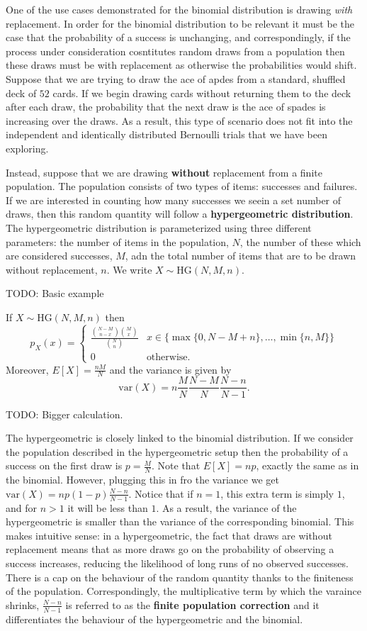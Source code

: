 \documentclass[
  letterpaper,
  DIV=11,
  numbers=noendperiod]{scrreprt}
\begin{document}
One of the use cases demonstrated for the binomial distribution is
drawing \emph{with} replacement. In order for the binomial distribution
to be relevant it must be the case that the probability of a success is
unchanging, and correspondingly, if the process under consideration
cosntitutes random draws from a population then these draws must be with
replacement as otherwise the probabilities would shift. Suppose that we
are trying to draw the ace of apdes from a standard, shuffled deck of
\(52\) cards. If we begin drawing cards without returning them to the
deck after each draw, the probability that the next draw is the ace of
spades is increasing over the draws. As a result, this type of scenario
does not fit into the independent and identically distributed Bernoulli
trials that we have been exploring.

Instead, suppose that we are drawing \textbf{without} replacement from a
finite population. The population consists of two types of items:
successes and failures. If we are interested in counting how many
successes we seein a set number of draws, then this random quantity will
follow a \textbf{hypergeometric distribution}. The hypergeometric
distribution is parameterized using three different parameters: the
number of items in the population, \(N\), the number of these which are
considered successes, \(M\), adn the total number of items that are to
be drawn without replacement, \(n\). We write \(X\sim\text{HG}(N,M,n)\).

TODO: Basic example

If \(X\sim\text{HG}(N,M,n)\) then
\[p_X(x) = \begin{cases}\frac{\binom{N-M}{n-x}\binom{M}{x}}{\binom{N}{n}} & x\in\{\max\{0,N-M+n\},\dots,\min\{n,M\}\} \\ 0 &\text{otherwise}.\end{cases}\]
Moreover, \(E[X] = \frac{nM}{N}\) and the variance is given by
\[\text{var}(X) = n\frac{M}{N}\frac{N-M}{N}\frac{N-n}{N-1}.\]

TODO: Bigger calculation.

The hypergeometric is closely linked to the binomial distribution. If we
consider the population described in the hypergeometric setup then the
probability of a success on the first draw is \(p=\frac{M}{N}\). Note
that \(E[X] = np\), exactly the same as in the binomial. However,
plugging this in fro the variance we get
\(\text{var}(X) = np(1-p)\frac{N-n}{N-1}\). Notice that if \(n=1\), this
extra term is simply \(1\), and for \(n > 1\) it will be less than
\(1\). As a result, the variance of the hypergeometric is smaller than
the variance of the corresponding binomial. This makes intuitive sense:
in a hypergeometric, the fact that draws are without replacement means
that as more draws go on the probability of observing a success
increases, reducing the likelihood of long runs of no observed
successes. There is a cap on the behaviour of the random quantity thanks
to the finiteness of the population. Correspondingly, the multiplicative
term by which the varaince shrinks, \(\frac{N-n}{N-1}\) is referred to
as the \textbf{finite population correction} and it differentiates the
behaviour of the hypergeometric and the binomial.
\end{document}
